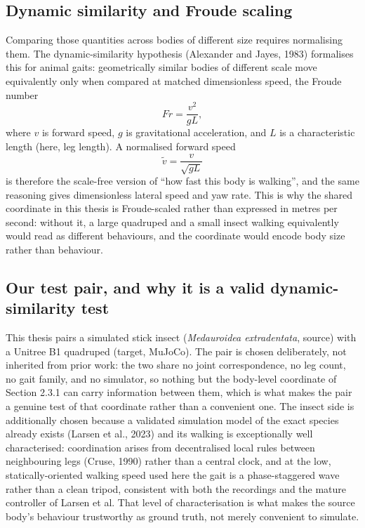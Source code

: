 \documentclass[12pt,a4paper,oneside]{report}
\begin{document}
\subsection{Dynamic similarity and Froude scaling}
Comparing those quantities across bodies of different size requires normalising them. The
dynamic-similarity hypothesis (Alexander and Jayes, 1983) formalises this for animal gaits:
geometrically similar bodies of different scale move equivalently only when compared at matched
dimensionless speed, the Froude number
\[
Fr = \frac{v^2}{gL},
\]
where $v$ is forward speed, $g$ is gravitational acceleration, and $L$ is a characteristic length (here, leg
length). A normalised forward speed
\[
\tilde{v} = \frac{v}{\sqrt{gL}}
\]
is therefore the scale-free version of ``how fast this body is walking'', and the same reasoning gives
dimensionless lateral speed and yaw rate. This is why the
shared coordinate in this thesis is Froude-scaled rather than expressed in metres per second: without
it, a large quadruped and a small insect walking equivalently would read as different behaviours, and
the coordinate would encode body size rather than behaviour.

\subsection{Our test pair, and why it is a valid dynamic-similarity test}
This thesis pairs a simulated stick insect (\emph{Medauroidea extradentata}, source) with a Unitree B1
quadruped (target, MuJoCo). The pair is chosen deliberately, not inherited from prior work: the two
share no joint correspondence, no leg count, no gait family, and no simulator, so nothing but the
body-level coordinate of Section 2.3.1 can carry information between them, which is what makes the
pair a genuine test of that coordinate rather than a convenient one. The insect side is additionally
chosen because a validated simulation model of the exact species already exists (Larsen et al., 2023)
and its walking is exceptionally well characterised: coordination arises from decentralised local
rules between neighbouring legs (Cruse, 1990) rather than a central clock, and at the low,
statically-oriented walking speed used here the gait is a phase-staggered wave rather than a clean
tripod, consistent with both the recordings and the mature controller of Larsen et al. That level of
characterisation is what makes the source body's behaviour trustworthy as ground truth, not merely
convenient to simulate.

\end{document}
